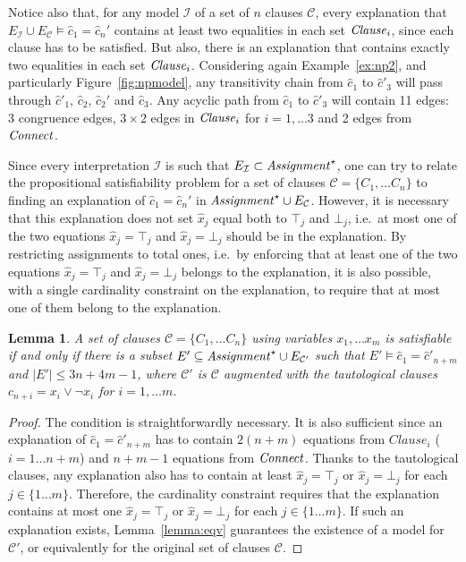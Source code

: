 \documentclass{easychair}
\newtheorem{lemma}{Lemma}
\begin{document}
\noindent Notice also that, for any model $\mathcal{I}$ of a set of $n$ clauses
$\mathcal{C}$, every explanation that $E_{\mathcal{I}} \cup E_\mathcal{C}
\models \hat{c}_1 = \hat{c}_n'$ contains at least two equalities in
each set ${\it Clause}_i$, since each clause has to be satisfied.  But also, there is
an explanation that contains exactly two equalities in each set ${\it Clause}_i$.
Considering again Example~\ref{ex:np2}, and particularly
Figure~\ref{fig:npmodel}, any transitivity chain from $\hat{c}_1$ to
$\hat{c}'_3$ will pass through $\hat{c}'_1$, $\hat{c}_2$, $\hat{c}_2'$ and
$\hat{c}_3$.  Any acyclic path from $\hat{c}_1$ to $\hat{c}'_3$ will contain 11
edges: 3 congruence edges, $3\times 2$ edges in ${\it Clause}_i$ for $i=1,\dots 3$
and 2 edges from ${\it Connect}$.

Since every interpretation $\mathcal{I}$ is such that $E_{\mathcal{I}} \subset
{\it Assignment}^\star$, one can try to relate the propositional satisfiability
problem for a set of clauses $\mathcal{C}= \{C_1, \dots C_n\}$ to finding an
explanation of $\hat{c}_1 = \hat{c}_n'$ in ${\it Assignment}^\star \cup
E_{\mathcal{C}}$.  However, it is necessary that this explanation does not set
$\hat{x}_j$ equal both to $\top_j$ and $\bot_j$, i.e.\ at most one of the two
equations $\hat{x}_j = \top_j$ and $\hat{x}_j = \bot_j$ should be in the
explanation.  By restricting assignments to total ones, i.e.\ by enforcing that
at least one of the two equations $\hat{x}_j = \top_j$ and $\hat{x}_j = \bot_j$
belongs to the explanation, it is also possible, with a single cardinality
constraint on the explanation, to require that at most one of them belong to the
explanation.


\begin{lemma}
A set of clauses $\mathcal{C}= \{C_1, \dots C_n\}$ using variables $x_1,\dots
x_m$ is satisfiable if and only if there is a subset $E' \subseteq
{\it Assignment}^\star \cup E_{\mathcal{C}'}$ such that $E'\models \hat{c}_1 =
\hat{c}'_{n+m}$ and $|E'| \leq 3n+4m-1$, where $\mathcal{C}'$ is $\mathcal{C}$
augmented with the tautological clauses $c_{n+i} = x_i \vee \neg x_i$ for
$i=1,\dots m$.
\end{lemma}
\begin{proof}
The condition is straightforwardly necessary.  It is also sufficient since an
explanation of $\hat{c}_1 = \hat{c}'_{n+m}$ has to contain $2(n + m)$
equations from $Clause_i$ ($i= 1\dots n + m$) and $n + m - 1$ equations from
${\it Connect}$.  Thanks to the tautological clauses, any explanation also has to
contain at least $\hat{x}_j = \top_j$ or $\hat{x}_j = \bot_j$ for each
$j\in\{1\dots m\}$. Therefore, the cardinality constraint requires that the explanation
contains at most one $\hat{x}_j = \top_j$ or $\hat{x}_j = \bot_j$ for each
$j\in\{1\dots m\}$.  If such an explanation exists, Lemma~\ref{lemma:eqv}
guarantees the existence of a model for $\mathcal{C'}$, or equivalently for
the original set of clauses $\mathcal{C}$.
\end{proof}
\end{document}
